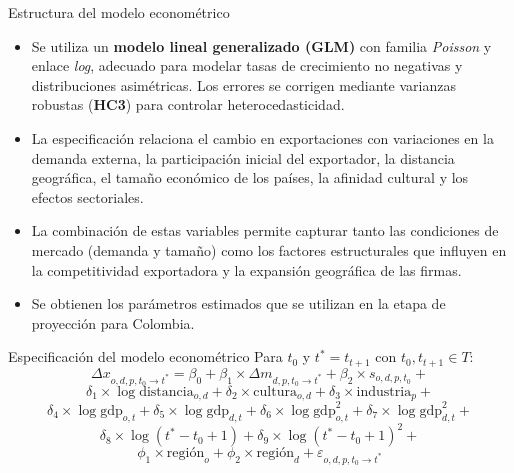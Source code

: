 \documentclass[aspectratio=169,xcolor=dvipsnames]{beamer}
\begin{document}
\begin{frame}{Estructura del modelo econométrico}
    \begin{itemize}
        \item Se utiliza un \textbf{modelo lineal generalizado (GLM)} con familia \textit{Poisson} y enlace \textit{log}, adecuado para modelar tasas de crecimiento no negativas y distribuciones asimétricas. Los errores se corrigen mediante varianzas robustas (\textbf{HC3}) para controlar heterocedasticidad.
        \item La especificación relaciona el cambio en exportaciones con variaciones en la demanda externa, la participación inicial del exportador, la distancia geográfica, el tamaño económico de los países, la afinidad cultural y los efectos sectoriales.
        \item La combinación de estas variables permite capturar tanto las condiciones de mercado (demanda y tamaño) como los factores estructurales que influyen en la competitividad exportadora y la expansión geográfica de las firmas.
        \item Se obtienen los parámetros estimados que se utilizan en la etapa de proyección para Colombia.
    \end{itemize}
\end{frame}

\begin{frame}{Especificación del modelo econométrico}
Para $t_0$ y $t^* = t_{t+1}$ con $t_0, t_{t+1} \in T$:
\begin{equation}
\Delta x_{o,d,p,t_0 \rightarrow t^*} =
\beta_0 + \beta_1 \times \Delta m_{d,p,t_0 \rightarrow t^*} +
\beta_2 \times s_{o,d,p,t_0} +
\end{equation}
\begin{equation*}
\delta_1 \times \log \text{distancia}_{o,d} +
\delta_2 \times \text{cultura}_{o,d} +
\delta_3 \times \text{industria}_p +
\end{equation*}
\begin{equation*}
\delta_4 \times \log \text{gdp}_{o,t} +
\delta_5 \times \log \text{gdp}_{d,t} +
\delta_6 \times \log \text{gdp}_{o,t}^2 +
\delta_7 \times \log \text{gdp}_{d,t}^2 +
\end{equation*}
\begin{equation*}
\delta_8 \times \log (t^*-t_0+1) +
\delta_9 \times \log (t^*-t_0+1)^2 +
\end{equation*}
\begin{equation*}
\phi_1 \times \text{región}_o +
\phi_2 \times \text{región}_d +
\varepsilon_{o,d,p,t_0 \rightarrow t^*}
\end{equation*}
\end{frame}
\end{document}
